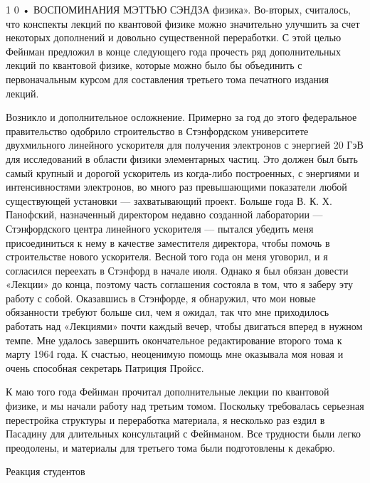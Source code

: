\documentclass[11pt,oneside]{article}
\begin{document}
1 0 • ВОСПОМИНАНИЯ МЭТТЬЮ СЭНДЗА физика». Во-вторых, считалось, что конспекты лекций по квантовой физике можно значительно улучшить за счет некоторых дополнений и довольно существенной переработки. С этой целью Фейнман предложил в конце следующего года прочесть ряд дополнительных лекций по квантовой физике, которые можно было бы объединить с первоначальным курсом для составления третьего тома печатного издания лекций.\par



Возникло и дополнительное осложнение. Примерно за год до этого федеральное правительство одобрило строительство в Стэнфордском университете двухмильного линейного ускорителя для получения электронов с энергией 20 ГэВ для исследований в области физики элементарных частиц. Это должен был быть самый крупный и дорогой ускоритель из когда-либо построенных, с энергиями и интенсивностями электронов, во много раз превышающими показатели любой существующей установки --- захватывающий проект. Больше года В. К. Х. Панофский, назначенный директором недавно созданной лаборатории --- Стэнфордского центра линейного ускорителя --- пытался убедить меня присоединиться к нему в качестве заместителя директора, чтобы помочь в строительстве нового ускорителя. Весной того года он меня уговорил, и я согласился переехать в Стэнфорд в начале июля. Однако я был обязан довести «Лекции» до конца, поэтому часть соглашения состояла в том, что я заберу эту работу с собой. Оказавшись в Стэнфорде, я обнаружил, что мои новые обязанности требуют больше сил, чем я ожидал, так что мне приходилось работать над «Лекциями» почти каждый вечер, чтобы двигаться вперед в нужном темпе. Мне удалось завершить окончательное редактирование второго тома к марту 1964 года. К счастью, неоценимую помощь мне оказывала моя новая и очень способная секретарь Патриция Пройсс.\par



К маю того года Фейнман прочитал дополнительные лекции по квантовой физике, и мы начали работу над третьим томом. Поскольку требовалась серьезная перестройка структуры и переработка материала, я несколько раз ездил в Пасадину для длительных консультаций с Фейнманом. Все трудности были легко преодолены, и материалы для третьего тома были подготовлены к декабрю.\par



Реакция студентов\par
\end{document}
